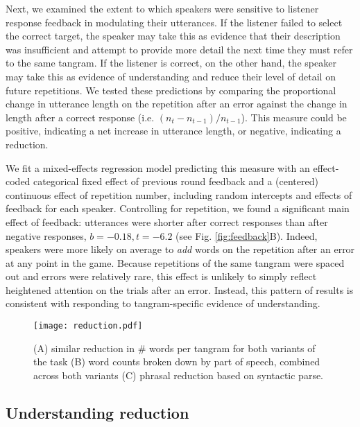 Next, we examined the extent to which speakers were sensitive to listener response feedback in modulating their utterances.
If the listener failed to select the correct target, the speaker may take this as evidence that their description was insufficient and attempt to provide more detail the next time they must refer to the same tangram. 
If the listener is correct, on the other hand, the speaker may take this as evidence of understanding and reduce their level of detail on future repetitions.
We tested these predictions by comparing the proportional change in utterance length on the repetition after an error against the change in length after a correct response (i.e. $(n_t - n_{t-1})/n_{t-1}$).
This measure could be positive, indicating a net increase in utterance length, or negative, indicating a reduction.

We fit a mixed-effects regression model predicting this measure with an effect-coded categorical fixed effect of previous round feedback and a (centered) continuous effect of repetition number, including random intercepts and effects of feedback for each speaker.
Controlling for repetition, we found a significant main effect of feedback: utterances were shorter after correct responses than after negative responses, $b = -0.18, t = -6.2$ (see Fig. \ref{fig:feedback}B).
Indeed, speakers were more likely on average to \emph{add} words on the repetition after an error at any point in the game.
Because repetitions of the same tangram were spaced out and errors were relatively rare, this effect is unlikely to simply reflect heightened attention on the trials after an error.
Instead, this pattern of results is consistent with responding to tangram-specific evidence of understanding.

\begin{figure}[t]
\texttt{[image: reduction.pdf]}
\caption{(A) similar reduction in \# words per tangram for both variants of the task (B) word counts broken down by part of speech, combined across both variants (C) phrasal reduction based on syntactic parse.} %
\label{fig:reduction}
\end{figure}

\subsection{Understanding reduction}\label{reduction}

